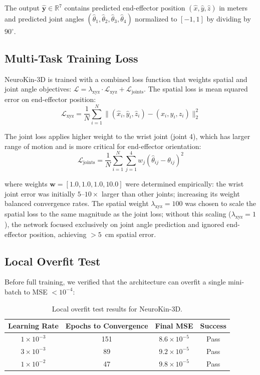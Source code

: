 \documentclass[12pt,a4paper,oneside]{report}
\begin{document}
The output $\hat{\mathbf{y}} \in \mathbb{R}^7$ contains predicted end-effector position $(\hat{x}, \hat{y}, \hat{z})$ in meters and predicted joint angles $(\hat{\theta}_1, \hat{\theta}_2, \hat{\theta}_3, \hat{\theta}_4)$ normalized to $[-1, 1]$ by dividing by $90^\circ$.
\subsection{Multi-Task Training Loss}
\label{subsec:multi_task_training_loss}

NeuroKin-3D is trained with a combined loss function that weights spatial and joint angle objectives: $\mathcal{L} = \lambda_{\text{xyz}} \cdot \mathcal{L}_{\text{xyz}} + \mathcal{L}_{\text{joints}}$. The spatial loss is mean squared error on end-effector position:
\begin{equation}\mathcal{L}_{\text{xyz}} = \frac{1}{N} \sum_{i=1}^{N} \|(\hat{x}_i, \hat{y}_i, \hat{z}_i) - (x_i, y_i, z_i)\|_2^2
\end{equation}

The joint loss applies higher weight to the wrist joint (joint 4), which has larger range of motion and is more critical for end-effector orientation:
\begin{equation}\mathcal{L}_{\text{joints}} = \frac{1}{N} \sum_{i=1}^{N} \sum_{j=1}^{4} w_j (\hat{\theta}_{ij} - \theta_{ij})^2
\end{equation}

where weights $\mathbf{w} = [1.0, 1.0, 1.0, 10.0]$ were determined empirically: the wrist joint error was initially $5\text{--}10\times$ larger than other joints; increasing its weight balanced convergence rates. The spatial weight $\lambda_{\text{xyz}} = 100$ was chosen to scale the spatial loss to the same magnitude as the joint loss; without this scaling ($\lambda_{\text{xyz}} = 1$), the network focused exclusively on joint angle prediction and ignored end-effector position, achieving $>5$~cm spatial error.
\subsection{Local Overfit Test}
\label{subsec:local_overfit_test}

Before full training, we verified that the architecture can overfit a single mini-batch to MSE $< 10^{-4}$:
\begin{table}[H]
\centering

\caption{Local overfit test results for NeuroKin-3D.}
\label{tab:overfit_test}
\begin{tabular}{cccc}
\toprule

Learning Rate & Epochs to Convergence & Final MSE & Success \\
\midrule

$1 \times 10^{-3}$ & 151 & $8.6 \times 10^{-5}$ & Pass \\
$3 \times 10^{-3}$ & 89 & $9.2 \times 10^{-5}$ & Pass \\
$1 \times 10^{-2}$ & 47 & $9.8 \times 10^{-5}$ & Pass \\
\bottomrule

\end{tabular}
\end{table}
\end{document}
